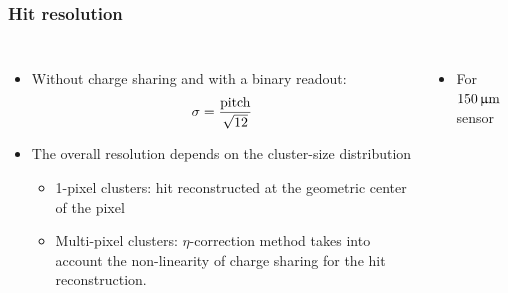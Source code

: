 \begin{frame}
  \frametitle{Hit resolution}

  \begin{columns}[t]
    \begin{itemize}
    \item Without charge sharing and with a binary readout: \\
      \begin{equation*}
        \sigma={\text{pitch} \over \sqrt{12}}
      \end{equation*}
    \item The overall resolution depends on the cluster-size
      distribution
      \begin{itemize}
      \item 1-pixel clusters: hit reconstructed at the geometric center
        of the pixel
      \item Multi-pixel clusters: $\eta$-correction method takes into
        account the non-linearity of charge sharing for the hit
        reconstruction.
      \end{itemize}
    \end{itemize}

    \begin{itemize}
    \item For $150\,\upmu\mathrm{m}$ sensor
    \end{itemize}

    \centering
\end{columns}
\end{frame}
